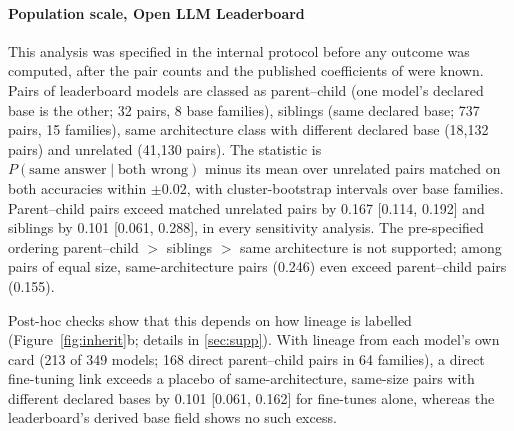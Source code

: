 \documentclass[preprint,12pt,authoryear]{elsarticle}
\begin{document}
\paragraph{Population scale, Open LLM Leaderboard} This analysis was specified in the internal protocol before any outcome was computed, after the pair counts and the published coefficients of \citet{kim2025correlated} were known. Pairs of leaderboard models are classed as parent--child (one model's declared base is the other; 32 pairs, 8 base families), siblings (same declared base; 737 pairs, 15 families), same architecture class with different declared base (18,132 pairs) and unrelated (41,130 pairs). The statistic is $P(\text{same answer} \mid \text{both wrong})$ minus its mean over unrelated pairs matched on both accuracies within $\pm0.02$, with cluster-bootstrap intervals over base families. Parent--child pairs exceed matched unrelated pairs by 0.167 [0.114, 0.192] and siblings by 0.101 [0.061, 0.288], in every sensitivity analysis. The pre-specified ordering parent--child $>$ siblings $>$ same architecture is not supported; among pairs of equal size, same-architecture pairs (0.246) even exceed parent--child pairs (0.155).

Post-hoc checks show that this depends on how lineage is labelled (Figure~\ref{fig:inherit}b; details in \ref{sec:supp}). With lineage from each model's own card (213 of 349 models; 168 direct parent--child pairs in 64 families), a direct fine-tuning link exceeds a placebo of same-architecture, same-size pairs with different declared bases by 0.101 [0.061, 0.162] for fine-tunes alone, whereas the leaderboard's derived base field shows no such excess.
\end{document}
